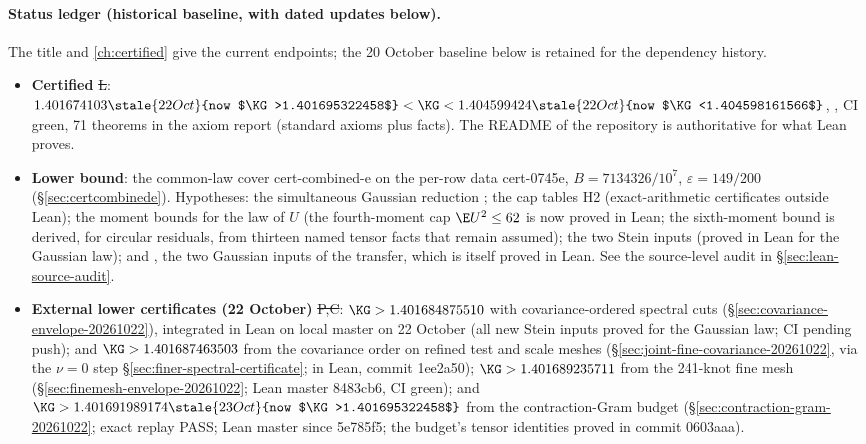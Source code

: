 \paragraph{Status ledger (historical baseline, with dated updates below).}
The title and \autoref{ch:certified} give the current endpoints;
the 20 October baseline below is retained for the dependency history.
\begin{itemize}
\item \textbf{Certified} \st{L}: $1.401674103\stale{22 Oct}{now $\KG>1.401695322458$}<\KG<1.404599424\stale{22 Oct}{now $\KG<1.404598161566$}$,  , CI green, 71 theorems in the axiom report (standard
axioms plus  facts). The README of the repository is authoritative for what Lean proves.
\item \textbf{Lower bound}: the common-law cover cert-combined-e on the per-row data cert-0745e, $B=7134326/10^7$, $\varepsilon=149/200$
(\S\ref{sec:certcombinede}). Hypotheses: the simultaneous Gaussian reduction ; the cap tables H2 (exact-arithmetic
certificates outside Lean); the moment bounds for the law of $U$ (the fourth-moment cap $\E U^2\le62$ is now proved in Lean; the sixth-moment bound is derived, for circular residuals, from thirteen named tensor facts  that remain assumed); the two Stein inputs (proved in Lean for the Gaussian law); and , the two Gaussian inputs of the transfer, which is itself proved in Lean. See the source-level audit in \S\ref{sec:lean-source-audit}.
\item \textbf{External lower certificates (22 October)} \st{P,C}: $\KG>1.401684875510$ with covariance-ordered spectral cuts (\S\ref{sec:covariance-envelope-20261022}), integrated in Lean on local master on 22 October (all new Stein inputs proved for the Gaussian law; CI pending push); and $\KG>1.401687463503$ from the covariance order on refined test and scale meshes (\S\ref{sec:joint-fine-covariance-20261022}, via the $\nu=0$ step \S\ref{sec:finer-spectral-certificate}; in Lean, commit 1ee2a50); $\KG>1.401689235711$ from the 241-knot fine mesh (\S\ref{sec:finemesh-envelope-20261022}; Lean master 8483cb6, CI green); and $\KG>1.401691989174\stale{23 Oct}{now $\KG>1.401695322458$}$ from the contraction-Gram budget (\S\ref{sec:contraction-gram-20261022}; exact replay PASS; Lean master since 5e785f5; the budget's tensor identities proved in commit 0603aaa).

\end{itemize}
